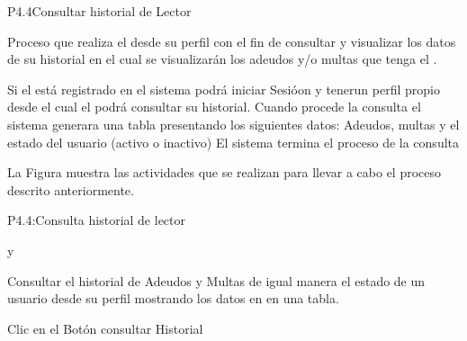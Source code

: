 
\begin{Proceso}{P4.4}{Consultar historial de Lector} {
  

  Proceso que realiza el  desde su perfil con el fin de consultar y visualizar los datos de su historial en el cual se visualizarán los adeudos y/o multas que tenga el .
  
Si el  está registrado en el sistema podrá iniciar Sesióon y tenerun perfil propio desde el cual el  podrá consultar su historial.
Cuando procede la consulta el sistema generara una tabla presentando los siguientes datos: Adeudos, multas y el estado del usuario (activo o inactivo)
El sistema termina el proceso de la consulta 



  \noindent La Figura  muestra las actividades que se realizan para llevar a cabo el proceso descrito anteriormente.


} {P4.4:Consulta historial de lector}


   { %
     y 
  }

   { %
    Consultar el historial de Adeudos y Multas de igual manera el estado de un usuario desde su perfil mostrando los datos en en una tabla.
  }

   { %
  	\begin{UClist}
  		\UCli Clic en el Botón consultar Historial
    \end {UClist}
  }
  
   { %
  }


\end{Proceso}
